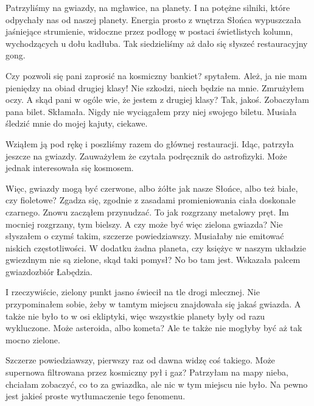 Patrzyliśmy na gwiazdy, na mgławice, na planety. I na potężne silniki, które odpychały nas od naszej planety.
Energia prosto z wnętrza Słońca wypuszczała jaśniejące strumienie, widoczne przez podłogę w postaci świetlistych kolumn, wychodzących u dołu kadłuba.
Tak siedzieliśmy aż dało się słyszeć restauracyjny gong.

\begin{dialogue}
	\ds{} Czy pozwoli się pani zaprosić na kosmiczny bankiet? \dm{} spytałem.
	\ds{} Ależ, ja nie mam pieniędzy na obiad drugiej klasy!
	\ds{} Nie szkodzi, niech będzie na mnie. \dm{} Zmrużyłem oczy. \dm{} A skąd pani w ogóle wie, że jestem z drugiej klasy?
	\ds{} Tak, jakoś. Zobaczyłam pana bilet. \dm{} Skłamała. Nigdy nie wyciągałem przy niej swojego biletu. Musiała śledzić mnie do mojej kajuty, ciekawe.
\end{dialogue}

Wziąłem ją pod rękę i poszliśmy razem do głównej restauracji.
Idąc, patrzyła jeszcze na gwiazdy. Zauważyłem że czytała podręcznik do astrofizyki.
Może jednak interesowała się kosmosem.

\begin{dialogue}
	\ds{} Więc, gwiazdy mogą być czerwone, albo żółte jak nasze Słońce, albo też białe, czy fioletowe?
	\ds{} Zgadza się, zgodnie z zasadami promieniowania ciała doskonale czarnego. \dm{} Znowu zacząłem przynudzać. \dm{} To jak rozgrzany metalowy pręt.
		Im mocniej rozgrzany, tym bielszy.
	\ds{} A czy może być więc zielona gwiazda?
	\ds{} Nie słyszałem o czymś takim, szczerze powiedziawszy. Musiałaby nie emitować niskich częstotliwości. 
		W dodatku żadna planeta, czy księżyc w naszym układzie gwiezdnym nie są zielone, skąd taki pomysł?
	\ds{} No bo tam jest. \dm{} Wskazała palcem gwiazdozbiór Łabędzia.
\end{dialogue}

I rzeczywiście, zielony punkt jasno świecił na tle drogi mlecznej.
Nie przypominałem sobie, żeby w tamtym miejscu znajdowała się jakaś gwiazda.
A także nie było to w osi ekliptyki, więc wszystkie planety były od razu wykluczone.
Może asteroida, albo kometa?
Ale te także nie mogłyby być aż tak mocno zielone.

\begin{dialogue}
	\ds{} Szczerze powiedziawszy, pierwszy raz od dawna widzę coś takiego. Może supernowa filtrowana przez kosmiczny pył i gaz?
	\ds{} Patrzyłam na mapy nieba, chciałam zobaczyć, co to za gwiazdka, ale nic w tym miejscu nie było.
	\ds{} Na pewno jest jakieś proste wytłumaczenie tego fenomenu.
\end{dialogue}


